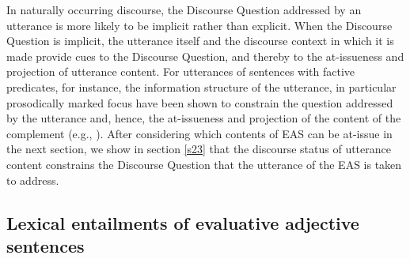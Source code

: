 \documentclass[11pt,fleqn]{article}
\newcommand{\6}{\mbox{$[\hspace*{-.6mm}[$}}
\newcommand{\9}{\mbox{$]\hspace*{-.6mm}]$}}
\begin{document}
%
%
%
%


In naturally occurring discourse, the Discourse Question addressed by an utterance is more likely to be implicit rather than explicit. When the Discourse Question is implicit, the utterance itself and the discourse context in which it is made provide cues to the Discourse Question, and thereby to the at-issueness and projection of utterance content. For utterances of sentences with factive predicates, for instance, the information structure of the utterance, in particular prosodically marked focus have been shown to constrain the question addressed by the utterance and, hence, the at-issueness and projection of the content of the complement (e.g., \citealt{beaver01,cummins-rohde2015,tonhauser-salt26,best-question,djaerv-bacovcin-salt27,mahler-nels}). After considering which contents of EAS can be at-issue in the next section, we show in section \ref{s23} that the discourse status of utterance content constrains the Discourse Question that the utterance of the EAS is taken to address.

\subsection{Lexical entailments of evaluative adjective sentences}\label{s22}
\end{document}
